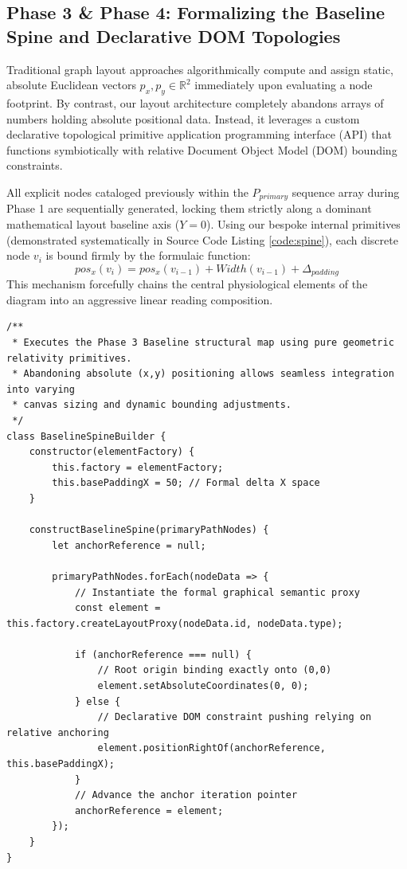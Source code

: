 \documentclass[fleqn,10pt]{wlscirep}
\begin{document}
\subsection*{Phase 3 \& Phase 4: Formalizing the Baseline Spine and Declarative DOM Topologies}
Traditional graph layout approaches algorithmically compute and assign static, absolute Euclidean vectors $p_{x}, p_{y} \in \mathbb{R}^2$ immediately upon evaluating a node footprint. By contrast, our layout architecture completely abandons arrays of numbers holding absolute positional data. Instead, it leverages a custom declarative topological primitive application programming interface (API) that functions symbiotically with relative Document Object Model (DOM) bounding constraints. 

All explicit nodes cataloged previously within the $P_{primary}$ sequence array during Phase 1 are sequentially generated, locking them strictly along a dominant mathematical layout baseline axis ($Y=0$). Using our bespoke internal primitives (demonstrated systematically in Source Code Listing \ref{code:spine}), each discrete node $v_i$ is bound firmly by the formulaic function:
$$ pos_{x}(v_i) = pos_{x}(v_{i-1}) + Width(v_{i-1}) + \Delta_{padding} $$
This mechanism forcefully chains the central physiological elements of the diagram into an aggressive linear reading composition.

\begin{lstlisting}[caption={Source code snippet demonstrating declarative Layout API implementation establishing the topological Baseline Spine.}, label={code:spine}]
/**
 * Executes the Phase 3 Baseline structural map using pure geometric relativity primitives.
 * Abandoning absolute (x,y) positioning allows seamless integration into varying 
 * canvas sizing and dynamic bounding adjustments.
 */
class BaselineSpineBuilder {
    constructor(elementFactory) {
        this.factory = elementFactory;
        this.basePaddingX = 50; // Formal delta X space
    }

    constructBaselineSpine(primaryPathNodes) {
        let anchorReference = null;
        
        primaryPathNodes.forEach(nodeData => {
            // Instantiate the formal graphical semantic proxy
            const element = this.factory.createLayoutProxy(nodeData.id, nodeData.type);
            
            if (anchorReference === null) {
                // Root origin binding exactly onto (0,0)
                element.setAbsoluteCoordinates(0, 0); 
            } else {
                // Declarative DOM constraint pushing relying on relative anchoring
                element.positionRightOf(anchorReference, this.basePaddingX); 
            }
            // Advance the anchor iteration pointer
            anchorReference = element;
        });
    }
}
\end{lstlisting}
\end{document}

